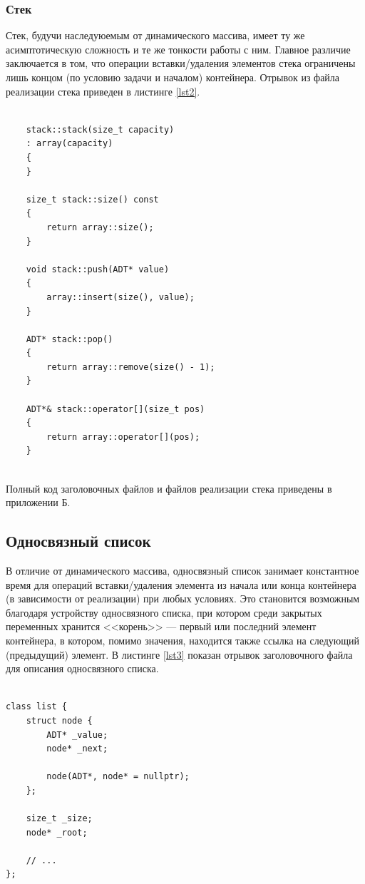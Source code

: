 \documentclass[a4paper,12pt]{article}
\begin{document}
\subsubsection{Стек}

Стек, будучи наследуюемым от динамического массива, имеет ту же асимптотическую сложность и те же тонкости работы с ним.
Главное различие заключается в том, что операции вставки/удаления элементов стека ограничены лишь концом (по условию задачи и началом) контейнера.
Отрывок из файла реализации стека приведен в листинге \ref{lst2}.

\begin{lstlisting}[caption={Файл реализации стека},label=lst2]
	
	stack::stack(size_t capacity)
	: array(capacity)
	{
	}

	size_t stack::size() const
	{
		return array::size();
	}

	void stack::push(ADT* value)
	{
		array::insert(size(), value);
	}
	
	ADT* stack::pop()
	{
		return array::remove(size() - 1);
	}
	
	ADT*& stack::operator[](size_t pos)
	{
		return array::operator[](pos);
	}
	
\end{lstlisting}

Полный код заголовочных файлов и файлов реализации стека приведены в приложении Б.

\cleardoublepage

\subsection{Односвязный список}

В отличие от динамического массива, односвязный список занимает константное время для операций вставки/удаления элемента из начала или конца контейнера (в зависимости от реализации) при любых условиях.
Это становится возможным благодаря устройству односвязного списка, при котором среди закрытых переменных хранится <<корень>> — первый или последний элемент контейнера, в котором, помимо значения, находится также ссылка на следующий (предыдущий) элемент.
В листинге \ref{lst3} показан отрывок заголовочного файла для описания односвязного списка.

\begin{lstlisting}[caption={Отрывок заголовочного файла для описания односвязного списка},label=lst3]

class list {
	struct node {
		ADT* _value;
		node* _next;
		
		node(ADT*, node* = nullptr);
	};
	
	size_t _size;
	node* _root;

	// ...
};

\end{lstlisting}
\end{document}
